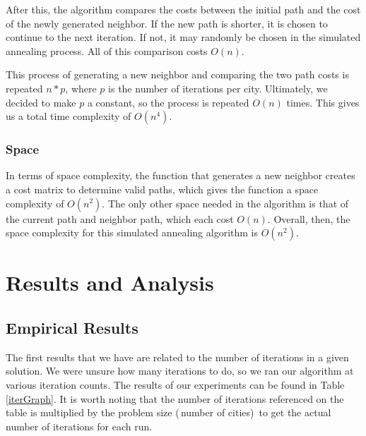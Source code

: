 \documentclass{article}
\def\bigO#1{$O(#1)$}
\begin{document}
\begin{multicols}{2}
        After this, the algorithm compares the costs between the initial path and the cost of the newly generated neighbor. If the new path is shorter, it is chosen to continue to the next iteration. If not, it may randomly be chosen in the simulated annealing process. All of this comparison costs \bigO{n}. 
        
        This process of generating a new neighbor and comparing the two path costs is repeated $n * p$, where $p$ is the number of iterations per city. Ultimately, we decided to make $p$ a constant, so the process is repeated \bigO{n} times. This gives us a total time complexity of \bigO{n^4}.
    
        \subsubsection{Space}

        In terms of space complexity, the function that generates a new neighbor creates a cost matrix to determine valid paths, which gives the function a space complexity of \bigO{n^2}. The only other space needed in the algorithm is that of the current path and neighbor path, which each cost \bigO{n}. Overall, then, the space complexity for this simulated annealing algorithm is \bigO{n^2}.
        
        \section{Results and Analysis}\label{results}
        \subsection{Empirical Results}

        The first results that we have are related to the number of iterations in a given solution. We were unsure how many iterations to do, so we ran our algorithm at various iteration counts. The results of our experiments can be found in Table \ref{iterGraph}. It is worth noting that the number of iterations referenced on the table is multiplied by the problem size (\,number of cities)\, to get the actual number of iterations for each run.
        
    \end{multicols}
\end{document}
